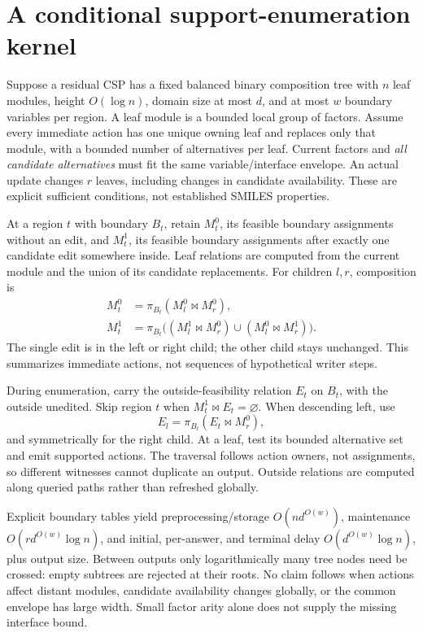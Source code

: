 \documentclass[11pt,a4paper]{article}
\begin{document}
\section{A conditional support-enumeration kernel}
Suppose a residual CSP has a fixed balanced binary composition tree with \(n\)
leaf modules, height \(O(\log n)\), domain size at most \(d\), and at most \(w\)
boundary variables per region. A leaf module is a bounded local group of factors.
Assume every immediate action has one unique owning leaf and replaces only that
module, with a bounded number of alternatives per leaf. Current factors and
\emph{all candidate alternatives} must fit the same variable/interface envelope.
An actual update changes \(r\) leaves, including changes in candidate availability.
These are explicit sufficient conditions, not established SMILES properties.

At a region \(t\) with boundary \(B_t\), retain \(M_t^0\), its feasible boundary
assignments without an edit, and \(M_t^1\), its feasible boundary assignments
after exactly one candidate edit somewhere inside. Leaf relations are computed
from the current module and the union of its candidate replacements. For
children \(l,r\), composition is
\begin{align}
 M_t^0&=\pi_{B_t}(M_l^0\Join M_r^0),\label{eq:zero}\\
 M_t^1&=\pi_{B_t}\bigl((M_l^1\Join M_r^0)
                    \cup(M_l^0\Join M_r^1)\bigr).\label{eq:one}
\end{align}
The single edit is in the left or right child; the other child stays unchanged.
This summarizes immediate actions, not sequences of hypothetical writer steps.

During enumeration, carry the outside-feasibility relation \(E_t\) on \(B_t\),
with the outside unedited. Skip region \(t\) when
\(M_t^1\Join E_t=\varnothing\). When descending left, use
\[
 E_l=\pi_{B_l}(E_t\Join M_r^0),
\]
and symmetrically for the right child. At a leaf, test its bounded alternative
set and emit supported actions. The traversal follows action owners, not
assignments, so different witnesses cannot duplicate an output. Outside
relations are computed along queried paths rather than refreshed globally.

Explicit boundary tables yield preprocessing/storage \(O(nd^{O(w)})\), maintenance
\(O(rd^{O(w)}\log n)\), and initial, per-answer, and terminal delay
\(O(d^{O(w)}\log n)\), plus output size. Between outputs only logarithmically
many tree nodes need be crossed: empty subtrees are rejected at their roots.
No claim follows when actions affect distant modules, candidate availability
changes globally, or the common envelope has large width. Small factor arity
alone does not supply the missing interface bound.
\end{document}

